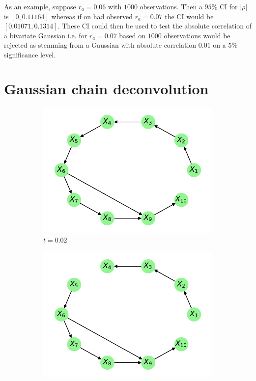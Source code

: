 \documentclass[../Thesis.tex]{subfiles}
\begin{document}
As an example, suppose $r_a=0.06$ with $1000$ observations. Then a $95\%$ CI for $|\rho|$ is $[0, 0.11164]$ whereas if on had observed $r_a = 0.07$ the CI would be $[0.01071, 0.1314]$. These CI could then be used to test the absolute correlation of a bivariate Gaussian i.e. for $r_a = 0.07$ based on $1000$ observations would be rejected as stemming from a Gaussian with absolute correlation $0.01$ on a $5\%$ significance level.


\newpage
\section{Gaussian chain deconvolution}

\begin{figure}[H]
    \centering
    \begin{subfigure}[t]{0.49\textwidth}
        \centering
        \includegraphics[width=.95\linewidth]{figures/Gaussian Chain Theoretical/Chain graph from triangular G obs - MI - cutoff 2e-2.pdf}
        \caption{$t = 0.02$}
    \end{subfigure}
    \hfill
    \begin{subfigure}[t]{0.49\textwidth}
        \centering
        \includegraphics[width=.95\linewidth]{figures/Gaussian Chain Theoretical/Chain graph from triangular G obs - MI - cutoff 2_1e-2.pdf}

\end{subfigure}
\end{figure}
\end{document}
